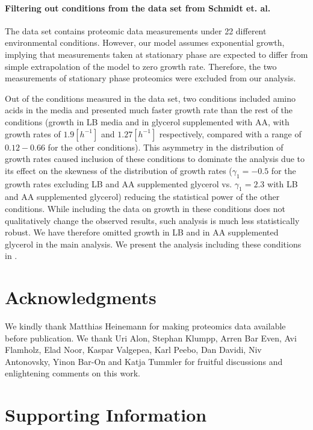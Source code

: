 \documentclass[10pt,letterpaper]{article}
\begin{document}
\paragraph{Filtering out conditions from the data set from Schmidt et. al.}


The \cite{Schmidt2015} data set contains proteomic data measurements under 22 different environmental conditions.
However, our model assumes exponential growth, implying that measurements taken at stationary phase are expected to differ from simple extrapolation of the model to zero growth rate.
Therefore, the two measurements of stationary phase proteomics were excluded from our analysis.

Out of the conditions measured in the \cite{Schmidt2015} data set, two conditions included amino acids in the media and presented much faster growth rate than the rest of the conditions (growth in LB media and in glycerol supplemented with AA, with growth rates of $1.9[h^{-1}]$ and $1.27[h^{-1}]$ respectively, compared with a range of $0.12-0.66$ for the other conditions).
This asymmetry in the distribution of growth rates caused inclusion of these conditions to dominate the analysis due to its effect on the skewness of the distribution of growth rates ($\gamma_1=-0.5$ for the growth rates excluding LB and AA supplemented glycerol vs. $\gamma_1=2.3$ with LB and AA supplemented glycerol) reducing the statistical power of the other conditions.
While including the data on growth in these conditions does not qualitatively change the observed results, such analysis is much less statistically robust.
We have therefore omitted growth in LB and in AA supplemented glycerol in the main analysis.
We present the analysis including these conditions in .

\section*{Acknowledgments}
We kindly thank Matthias Heinemann for making proteomics data available before publication.
We thank Uri Alon, Stephan Klumpp, Arren Bar Even, Avi Flamholz, Elad Noor, Kaspar Valgepea, Karl Peebo, Dan Davidi, Niv Antonovsky, Yinon Bar-On and Katja Tummler for fruitful discussions and enlightening comments on this work.



\section*{Supporting Information}
\end{document}

